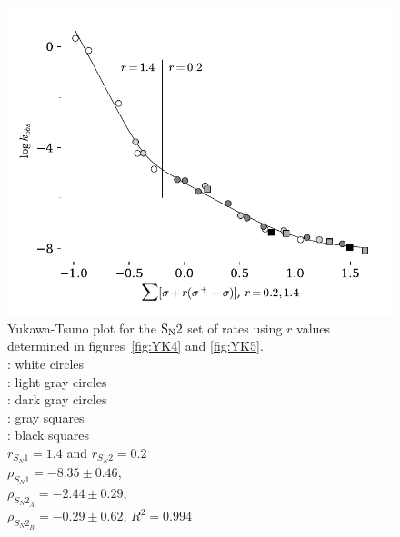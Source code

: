 \documentclass{tufte-handout}
\begin{document}
\begin{figure}[h!]
  \centering
  \includegraphics[scale=0.8]{images/plot12.pdf}
  \caption[-5mm]{Yukawa-Tsuno plot for the $\rm S_N2$ set of rates using $r$ values determined in figures~\ref{fig:YK4} and \ref{fig:YK5}.  \vspace{2mm} \\
  : white circles  \\
  : light gray circles  \\
  : dark gray circles  \\
  : gray squares   \\
  : black squares  \vspace{2mm}  \\

 {$r_{S_N1} = 1.4$} and {$r_{S_N2} = 0.2$} \vspace{2mm}  \\
 $\rho_{{S_N1}} = -8.35 \pm 0.46$,   \\
 $\rho_{{S_N2}_A} = -2.44 \pm 0.29$,   \\
 $\rho_{{S_N2}_B} = -0.29 \pm 0.62$, $R^2 = 0.994$ \vspace{2mm} \\
 } 
\label{fig:YK6}
\end{figure}
\end{document}
